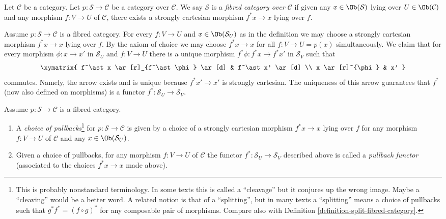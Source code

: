 \begin{definition}
\label{definition-fibred-category}
Let $\mathcal{C}$ be a category.
Let $p : \mathcal{S} \to \mathcal{C}$ be a category over $\mathcal{C}$.
We say $\mathcal{S}$ is a {\it fibred category over $\mathcal{C}$}
if given any $x \in \Ob(\mathcal{S})$ lying over
$U \in \Ob(\mathcal{C})$ and any morphism $f : V \to U$ of
$\mathcal{C}$, there exists a strongly cartesian morphism $f^*x \to x$
lying over $f$.
\end{definition}

\noindent
Assume $p : \mathcal{S} \to \mathcal{C}$ is a fibred category.
For every $f : V \to U$ and $x\in \Ob(\mathcal{S}_U)$
as in the definition we may choose a strongly cartesian morphism
$f^\ast x \to x$ lying over $f$. By the axiom of choice we may choose
$f^*x \to x$ for all $f: V \to U = p(x)$ simultaneously.
We claim that for every morphism $\phi : x \to x'$ in $\mathcal{S}_U$
and $f : V \to U$ there is a unique
morphism $f^\ast \phi : f^\ast x \to f^\ast x'$ in $\mathcal{S}_V$
such that
$$
\xymatrix{
f^\ast x \ar[r]_{f^\ast \phi} \ar[d] & f^\ast x' \ar[d] \\
x \ar[r]^{\phi} & x' }
$$
commutes. Namely, the arrow exists and is unique because $f^*x' \to x'$ is
strongly cartesian. The uniqueness of this arrow guarantees that
$f^\ast$ (now also defined on morphisms) is a
functor $ f^\ast : \mathcal{S}_U \to \mathcal{S}_V$.

\begin{definition}
\label{definition-pullback-functor-fibred-category}
Assume $p : \mathcal{S} \to \mathcal{C}$ is a fibred category.
\begin{enumerate}
\item A {\it choice of pullbacks}\footnote{This is probably nonstandard
terminology. In some texts this is called a ``cleavage''  but it conjures up
the wrong image. Maybe a ``cleaving'' would be a better word.
A related notion is that of a ``splitting'', but in many texts a ``splitting''
means a choice of pullbacks such that $g^*f^* = (f \circ g)^*$
for any composable pair of morphisms. Compare
also with Definition \ref{definition-split-fibred-category}.}
for $p : \mathcal{S} \to \mathcal{C}$
is given by a choice of a strongly cartesian morphism
$f^\ast x \to x$ lying over $f$ for any morphism
$f: V \to U$ of $\mathcal{C}$ and any $x \in \Ob(\mathcal{S}_U)$.
\item Given a choice of pullbacks,
for any morphism $f : V \to U$ of $\mathcal{C}$
the functor $f^* : \mathcal{S}_U \to \mathcal{S}_V$ described
above is called a {\it pullback functor} (associated to the choices
$f^*x \to x$ made above).
\end{enumerate}
\end{definition}

